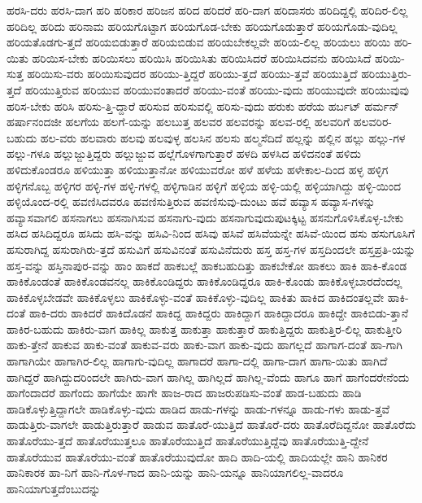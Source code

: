 {ಹರಸಿ-ದರು
ಹರಸಿ-ದಾಗ
ಹರಿ
ಹರಿಕಾರ
ಹರಿಜನ
ಹರಿದ
ಹರಿದರೆ
ಹರಿ-ದಾಗ
ಹರಿದಾಸರು
ಹರಿದಿದ್ದಲ್ಲಿ
ಹರಿದಿರ-ಲಿಲ್ಲ
ಹರಿದಿಲ್ಲ
ಹರಿದು
ಹರಿನಾಮ
ಹರಿಯಗೊಟ್ಟಾಗ
ಹರಿಯಗೊಡ-ಬೇಕು
ಹರಿಯಗೊಡುತ್ತಾರೆ
ಹರಿಯಗೊಡು-ವುದಿಲ್ಲ
ಹರಿಯತೊಡಗು-ತ್ತದೆ
ಹರಿಯಬಿಡುತ್ತಾರೆ
ಹರಿಯಬಿಡುವ
ಹರಿಯಬೇಕಲ್ಲವೇ
ಹರಿಯ-ಲಿಲ್ಲ
ಹರಿಯಲು
ಹರಿಯಿ
ಹರಿ-ಯಿತು
ಹರಿಯಿಸ-ಬೇಕು
ಹರಿಯಿಸಲು
ಹರಿಯಿಸಿ
ಹರಿಯಿಸಿತು
ಹರಿಯಿಸಿದರೆ
ಹರಿಯಿಸಿದವನು
ಹರಿಯಿಸಿದೆ
ಹರಿಯಿ-ಸುತ್ತ
ಹರಿಯಿಸು-ವರು
ಹರಿಯಿಸುವುದರ
ಹರಿಯು-ತ್ತಿದ್ದರೆ
ಹರಿಯು-ತ್ತದೆ
ಹರಿಯು-ತ್ತವೆ
ಹರಿಯುತ್ತಿದೆ
ಹರಿಯುತ್ತಿರು-ತ್ತದೆ
ಹರಿಯುತ್ತಿರುವ
ಹರಿಯುವ
ಹರಿಯುವಂತಾದರೆ
ಹರಿಯು-ವಂತೆ
ಹರಿಯು-ವುದು
ಹರಿಯುವುದೇ
ಹರಿಯುವುವು
ಹರಿಸ-ಬೇಕು
ಹರಿಸಿ
ಹರಿಸು-ತ್ತಿ-ದ್ದಾರೆ
ಹರಿಸುವ
ಹರಿಸುವಲ್ಲಿ
ಹರಿಸು-ವುದು
ಹರುಕು
ಹರೆಯ
ಹರ್ಬಟ್
ಹರ್ಮನ್
ಹರ್ಷಾನಂದಜೀ
ಹಲಗೆಯ
ಹಲಗೆ-ಯನ್ನು
ಹಲಬುತ್ತ
ಹಲವರ
ಹಲವರನ್ನು
ಹಲವ-ರಲ್ಲಿ
ಹಲವರಿಗೆ
ಹಲವರಿರ-ಬಹುದು
ಹಲ-ವರು
ಹಲವಾರು
ಹಲವು
ಹಲವುಳ್ಳ
ಹಲಸಿನ
ಹಲಸು
ಹಲ್ಮಸೆದಿದೆ
ಹಲ್ಲನ್ನು
ಹಲ್ಲಿನ
ಹಲ್ಲು
ಹಲ್ಲು-ಗಳ
ಹಲ್ಲು-ಗಳೂ
ಹಲ್ಲುಜ್ಜುತ್ತಿದ್ದರು
ಹಲ್ಲುಜ್ಜುವ
ಹಲ್ಲೆಗೊಳಗಾಗುತ್ತಾರೆ
ಹಳದಿ
ಹಳಸಿದ
ಹಳಿದನಂತೆ
ಹಳಿದು
ಹಳಿದುಕೊಂಡರೂ
ಹಳಿಯುತ್ತಾ
ಹಳಿಯುತ್ತಾನೋ
ಹಳಿಯುವರೋ
ಹಳೆ
ಹಳೆಯ
ಹಳೇಕಾಲ-ದಿಂದ
ಹಳ್ಳ
ಹಳ್ಳಿಗ
ಹಳ್ಳಿಗನೊಬ್ಬ
ಹಳ್ಳಿಗರ
ಹಳ್ಳಿ-ಗಳ
ಹಳ್ಳಿ-ಗಳಲ್ಲಿ
ಹಳ್ಳಿಗಾಡಿನ
ಹಳ್ಳಿಗೆ
ಹಳ್ಳಿಯ
ಹಳ್ಳಿ-ಯಲ್ಲಿ
ಹಳ್ಳಿಯಾಗಿದ್ದು
ಹಳ್ಳಿ-ಯಿಂದ
ಹಳ್ಳಿಯೊಂದ-ರಲ್ಲಿ
ಹವಣಿಸಿದವರೂ
ಹವಣಿಸುತ್ತಿರುವ
ಹವಣಿಸುವು-ದುಂಟು
ಹವೆ
ಹವ್ಯಾಸ
ಹವ್ಯಾಸ-ಗಳನ್ನು
ಹವ್ಯಾಸವಾಗಲಿ
ಹಸನಾಗಲು
ಹಸನಾಗಿಸುವ
ಹಸನಾಗು-ವುದು
ಹಸನಾಗುವುದುಪುಟಕ್ಕಿಟ್ಟ
ಹಸನುಗೊಳಿಸಿಕೊಳ್ಳ-ಬೇಕು
ಹಸಿದ
ಹಸಿದಿದ್ದರೂ
ಹಸಿದು
ಹಸಿ-ವನ್ನು
ಹಸಿವಿ-ನಿಂದ
ಹಸಿವು
ಹಸಿವೆ
ಹಸಿವೆಯನ್ನೇ
ಹಸಿವೆ-ಯಿಂದ
ಹಸು
ಹಸುಗೂಸಿಗೆ
ಹಸುರಾಗಿದ್ದ
ಹಸುರಾಗಿರು-ತ್ತದೆ
ಹಸುವಿಗೆ
ಹಸುವಿನಂತೆ
ಹಸುವಿನೆದುರು
ಹಸ್ತ
ಹಸ್ತ-ಗಳ
ಹಸ್ತದಿಂದಲೇ
ಹಸ್ತಪ್ರತಿ-ಯನ್ನು
ಹಸ್ತ-ವನ್ನು
ಹಸ್ತಿನಾಪುರ-ವನ್ನು
ಹಾಂ
ಹಾಕದೆ
ಹಾಕಬಲ್ಲೆ
ಹಾಕಬಹುದಿತ್ತು
ಹಾಕಬೇಕೋ
ಹಾಕಲು
ಹಾಕಿ
ಹಾಕಿ-ಕೊಂಡ
ಹಾಕಿಕೊಂಡಂತೆ
ಹಾಕಿಕೊಂಡವನಲ್ಲ
ಹಾಕಿಕೊಂಡಿದ್ದರು
ಹಾಕಿಕೊಂಡಿದ್ದರೂ
ಹಾಕಿ-ಕೊಂಡು
ಹಾಕಿಕೊಳ್ಳಬಾರದೆಂದಲ್ಲ
ಹಾಕಿಕೊಳ್ಳಬೇಡವೇ
ಹಾಕಿಕೊಳ್ಳಲು
ಹಾಕಿಕೊಳ್ಳು-ವಂತೆ
ಹಾಕಿಕೊಳ್ಳು-ವುದಿಲ್ಲ
ಹಾಕಿತು
ಹಾಕಿದ
ಹಾಕಿದಂತಲ್ಲವೇ
ಹಾಕಿ-ದಂತೆ
ಹಾಕಿ-ದರು
ಹಾಕಿದರೆ
ಹಾಕಿದೊಡನೆ
ಹಾಕಿದ್ದ
ಹಾಕಿದ್ದರು
ಹಾಕಿದ್ದಾಗ
ಹಾಕಿದ್ದಾದರೂ
ಹಾಕಿದ್ದೇ
ಹಾಕಿಬಿಡು-ತ್ತಾನೆ
ಹಾಕಿರ-ಬಹುದು
ಹಾಕಿರು-ವಾಗ
ಹಾಕಿಲ್ಲ
ಹಾಕುತ್ತ
ಹಾಕುತ್ತಾ
ಹಾಕುತ್ತಾರೆ
ಹಾಕುತ್ತಿದ್ದರು
ಹಾಕುತ್ತಿರ-ಲಿಲ್ಲ
ಹಾಕುತ್ತೀರಿ
ಹಾಕು-ತ್ತೇನೆ
ಹಾಕುವ
ಹಾಕು-ವಂತೆ
ಹಾಕುವ-ವರು
ಹಾಕು-ವಾಗ
ಹಾಕು-ವುದು
ಹಾಗಲ್ಲದೆ
ಹಾಗಾಗ-ದಂತೆ
ಹಾ-ಗಾಗಿ
ಹಾಗಾಗಿಯೇ
ಹಾಗಾಗಿರ-ಲಿಲ್ಲ
ಹಾಗಾಗು-ವುದಿಲ್ಲ
ಹಾಗಾದರೆ
ಹಾಗಾ-ದಲ್ಲಿ
ಹಾಗಾ-ದಾಗ
ಹಾಗಾ-ಯಿತು
ಹಾಗಿದೆ
ಹಾಗಿದ್ದರೆ
ಹಾಗಿದ್ದುದರಿಂದಲೇ
ಹಾಗಿರು-ವಾಗ
ಹಾಗಿಲ್ಲ
ಹಾಗಿಲ್ಲದೆ
ಹಾಗಿಲ್ಲ-ವೆಂದು
ಹಾಗೂ
ಹಾಗೆ
ಹಾಗೆಂದರೇನೆಂದು
ಹಾಗೆಂದಾದರೆ
ಹಾಗೆಂದು
ಹಾಗೆಯೇ
ಹಾಗೇ
ಹಾಜ-ರಾದ
ಹಾಜರುಪಡಿಸು-ವಂತೆ
ಹಾಡ-ಬಹುದು
ಹಾಡಿ
ಹಾಡಿಕೊಳ್ಳುತ್ತಿದ್ದಾಗಲೇ
ಹಾಡಿಕೊಳ್ಳು-ವುದು
ಹಾಡಿದ
ಹಾಡು-ಗಳನ್ನು
ಹಾಡು-ಗಳನ್ನೂ
ಹಾಡು-ಗಳು
ಹಾಡು-ತ್ತವೆ
ಹಾಡುತ್ತಿರು-ವಾಗಲೇ
ಹಾಡುತ್ತಿರುತ್ತಾರೆ
ಹಾಡುವ
ಹಾತೊರೆ-ಯುತ್ತಿದೆ
ಹಾತೊರೆ-ದರು
ಹಾತೊರೆದಿದ್ದನೋ
ಹಾತೊರೆದು
ಹಾತೊರೆಯು-ತ್ತದೆ
ಹಾತೊರೆಯುತ್ತಲೂ
ಹಾತೊರೆಯುತ್ತಿದೆ
ಹಾತೊರೆಯುತ್ತಿದ್ದೆವು
ಹಾತೊರೆಯುತ್ತಿ-ದ್ದೇನೆ
ಹಾತೊರೆಯುವ
ಹಾತೊರೆಯು-ವಂತೆ
ಹಾತೊರೆಯುವುದೋ
ಹಾದಿ
ಹಾದಿ-ಯಲ್ಲಿ
ಹಾದಿಯಲ್ಲೇ
ಹಾನಿ
ಹಾನಿಕರ
ಹಾನಿಕಾರಕ
ಹಾ-ನಿಗೆ
ಹಾನಿ-ಗೊಳ-ಗಾದ
ಹಾನಿ-ಯನ್ನು
ಹಾನಿ-ಯನ್ನೂ
ಹಾನಿಯಾಗಲಿಲ್ಲ-ವಾದರೂ
ಹಾನಿಯಾಗುತ್ತದೆಂಬುದನ್ನು
}
